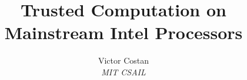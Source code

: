 \documentclass[11pt,twocolumn]{article}
\begin{document}
\title{Trusted Computation on Mainstream Intel Processors}
\author{Victor Costan \\ \em MIT CSAIL}
\date{}

\maketitle




%
%

\setlength{\bibsep}{1pt}
\small

%

\end{document}
